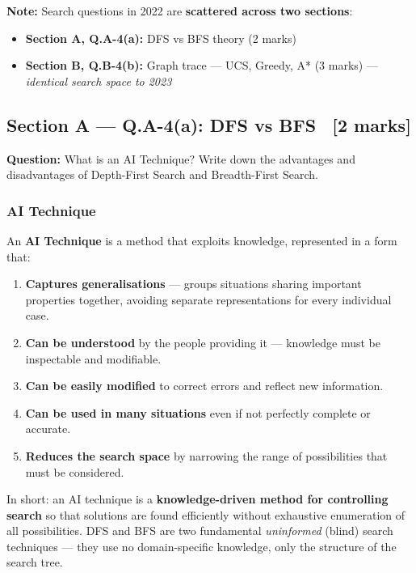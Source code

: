 \documentclass[12pt, a4paper]{article}
\newenvironment{solutionbox}{\begin{mdframed}[style=solutionframe]}{\end{mdframed}}
\begin{document}
\textbf{Note:} Search questions in 2022 are \textbf{scattered across two sections}:
\begin{itemize}[noitemsep]
  \item \textbf{Section A, Q.A-4(a):} DFS vs BFS theory (2 marks)
  \item \textbf{Section B, Q.B-4(b):} Graph trace — UCS, Greedy, A* (3 marks) — \emph{identical search space to 2023}
\end{itemize}

\subsection{Section A — Q.A-4(a): DFS vs BFS \ [2 marks]}

\begin{solutionbox}
\textbf{Question:} What is an AI Technique? Write down the advantages and disadvantages of Depth-First Search and Breadth-First Search.
\end{solutionbox}

\subsubsection*{AI Technique}

An \textbf{AI Technique} is a method that exploits knowledge, represented in a form that:
\begin{enumerate}[noitemsep]
  \item \textbf{Captures generalisations} — groups situations sharing important properties together, avoiding separate representations for every individual case.
  \item \textbf{Can be understood} by the people providing it — knowledge must be inspectable and modifiable.
  \item \textbf{Can be easily modified} to correct errors and reflect new information.
  \item \textbf{Can be used in many situations} even if not perfectly complete or accurate.
  \item \textbf{Reduces the search space} by narrowing the range of possibilities that must be considered.
\end{enumerate}

\noindent In short: an AI technique is a \textbf{knowledge-driven method for controlling search} so that solutions are found efficiently without exhaustive enumeration of all possibilities. DFS and BFS are two fundamental \emph{uninformed} (blind) search techniques — they use no domain-specific knowledge, only the structure of the search tree.
\end{document}
